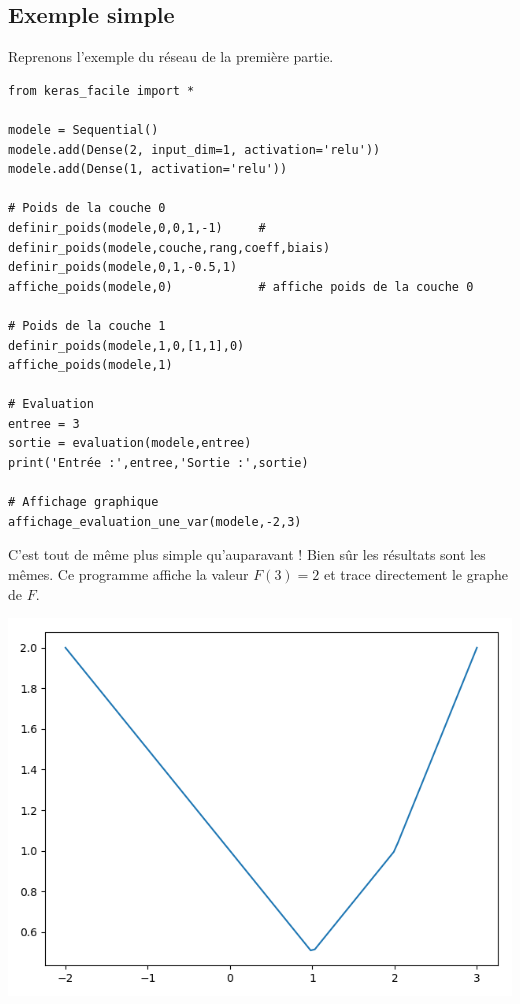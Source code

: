 \documentclass[11pt,class=report,crop=false]{standalone}
\begin{document}
\subsection{Exemple simple}

Reprenons l'exemple du réseau de la première partie.




\begin{lstlisting}
from keras_facile import *

modele = Sequential()
modele.add(Dense(2, input_dim=1, activation='relu'))
modele.add(Dense(1, activation='relu'))

# Poids de la couche 0
definir_poids(modele,0,0,1,-1)     # definir_poids(modele,couche,rang,coeff,biais)
definir_poids(modele,0,1,-0.5,1)
affiche_poids(modele,0)            # affiche poids de la couche 0

# Poids de la couche 1
definir_poids(modele,1,0,[1,1],0) 
affiche_poids(modele,1) 

# Evaluation
entree = 3
sortie = evaluation(modele,entree)
print('Entrée :',entree,'Sortie :',sortie)

# Affichage graphique
affichage_evaluation_une_var(modele,-2,3)
\end{lstlisting}

C'est tout de même plus simple qu'auparavant !
Bien sûr les résultats sont les mêmes. Ce programme affiche la valeur $F(3) = 2$
et trace directement le graphe de $F$.

\begin{center}
\includegraphics[scale=\myscale,scale=0.4]{figures/pythontf-keras-01}
\end{center}
\end{document}
